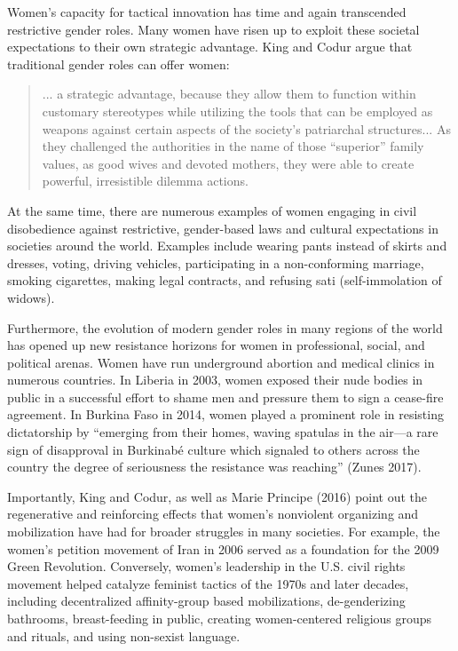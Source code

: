 \documentclass[twoside,a4paper,12pt,fleqn,openany]{extbook}
\begin{document}
Women’s capacity for tactical innovation has time and again transcended restrictive gender roles. Many women have risen up to exploit these societal expectations to their own strategic advantage. King and Codur argue that traditional gender roles can offer women:

\begin{quote}
... a strategic advantage, because they allow them to function within customary stereotypes while utilizing the tools that can be employed as weapons against certain aspects of the society’s patriarchal structures... As they challenged the authorities in the name of those “superior” family values, as good wives and devoted mothers, they were able to create powerful, irresistible dilemma actions.\end{quote}

At the same time, there are numerous examples of women engaging in civil disobedience against restrictive, gender-based laws and cultural expectations in societies around the world. Examples include wearing pants instead of skirts and dresses, voting, driving vehicles, participating in a non-conforming marriage, smoking cigarettes, making legal contracts, and refusing sati (self-immolation of widows).

Furthermore, the evolution of modern gender roles in many regions of the world has opened up new resistance horizons for women in professional, social, and political arenas. Women have run underground abortion and medical clinics in numerous countries. In Liberia in 2003, women exposed their nude bodies in public in a successful effort to shame men and pressure them to sign a cease-fire agreement. In Burkina Faso in 2014, women played a prominent role in resisting dictatorship by “emerging from their homes, waving spatulas in the air—a rare sign of disapproval in Burkinabé culture which signaled to others across the country the degree of seriousness the resistance was reaching” (Zunes 2017).

Importantly, King and Codur, as well as Marie Principe (2016) point out the regenerative and reinforcing effects that women’s nonviolent organizing and mobilization have had for broader struggles in many societies. For example, the women’s petition movement of Iran in 2006 served as a foundation for the 2009 Green Revolution. Conversely, women’s leadership in the U.S. civil rights movement helped catalyze feminist tactics of the 1970s and later decades, including decentralized affinity-group based mobilizations, de-genderizing bathrooms, breast-feeding in public, creating women-centered religious groups and rituals, and using non-sexist language.
\end{document}
